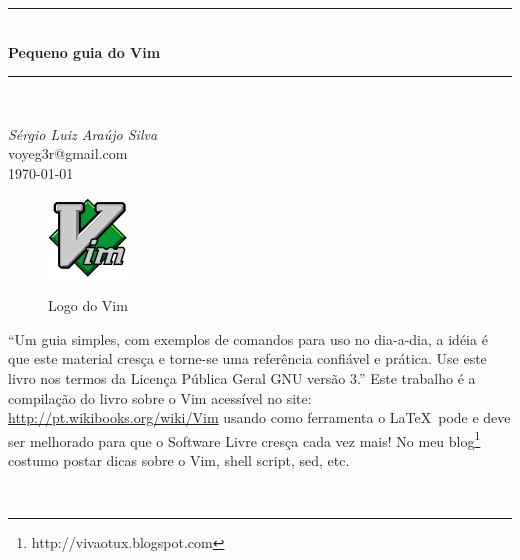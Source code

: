 \documentclass[10pt,a4paper,openany]{book}
\newcommand{\titulo}{Pequeno guia do Vim}
\begin{document}
{}

\begin{titlepage}
 \begin{flushleft}
	\vspace{2mm}
	\vspace{2mm}
	\vspace{2mm}
 \end{flushleft}
	\vspace{2cm}
\begin{center}
	\rule{12cm}{1mm} \\ \vspace{2mm}
	{\LARGE{\bf{\titulo}}} \\
	\vspace{-1mm}
	\rule{12cm}{1mm} \\

               \begin{center}
	{\Large{\em{Sérgio Luiz Araújo Silva}}}\\
		   voyeg3r@gmail.com \\
			\vspace{0.5cm}
       {\Large{\today}}
	        \end{center}

  \begin{figure}[h]
    \center
    \includegraphics{img/vimlogo.png}
    \label{logodovim}
    \caption{Logo do Vim}
\end{figure}

	\vspace{3cm}
	\begin{flushright}
	\begin{minipage}[t]{8cm}
	         ``Um guia simples, com exemplos de comandos
			 para uso no dia-a-dia, a idéia é que este
			 material cresça e torne-se uma referência confiável
			 e prática. Use este livro nos termos da Licença Pública Geral GNU versão 3.''
			 Este trabalho é a compilação do livro sobre o Vim acessível no site:
		\url{http://pt.wikibooks.org/wiki/Vim} usando como ferramenta o \LaTeX\,
		pode e deve ser melhorado para
	     que o Software Livre cresça cada vez mais!  No meu
		 blog\footnote{http://vivaotux.blogspot.com} costumo postar dicas sobre
	 o Vim, shell script, sed, etc.
	\end{minipage} \\
	\end{flushright}

	\vspace{1cm}

\end{center}
\end{titlepage}
\end{document}
